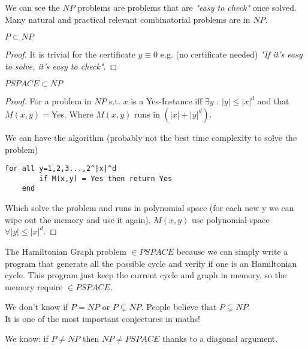 \begin{remark} We can see the $NP$ problems are problems that are \textit{"easy to check"} once solved.
Many natural and practical relevant combinatorial problems are in $NP$.
\end{remark}
\vspace{0.5cm}
\begin{theorem}$P\subset NP$
\end{theorem}
\begin{proof}
It is trivial for the certificate $y\equiv 0$ e.g. (no certificate needed) \textit{"If it's easy to solve, it's easy to check"}.
\end{proof}
\vspace{0.5cm}
\begin{theorem} $PSPACE \subset NP$
\end{theorem}
\begin{proof}
For a problem in $NP$ s.t. $x$ is a Yes-Instance iff $\exists y$ : $|y|\leq|x|^d$ and  that
$M(x,y)=$Yes. Where $M(x,y)$ runs in $(|x|+|y|^d)$.

We can have the algorithm (probably not the best time complexity to solve the problem)
\begin{lstlisting}[caption=$PSPACE \subset NP$ control algorithm]
    for all y=1,2,3...,2^|x|^d
        if M(x,y) = Yes then return Yes
    end
\end{lstlisting}

Which solve the problem and runs in polynomial space (for each new y we can wipe out the memory and use it again). $M(x,y)$ use polynomial-space $\forall |y| \leq |x|^d$.
\end{proof}
\vspace{0.5cm}
\begin{remark}
The Hamiltonian Graph problem $\in PSPACE$ because we can simply write a program that generate all the possible cycle and
verify if one is an Hamiltonian cycle. This program just keep the current cycle and graph in memory, so the memory require $\in PSPACE$.
\end{remark}
\vspace{0.5cm}
We don't know if $P=NP$ or $P\subsetneq NP$. People believe that $P\subsetneq NP$.\\
It is one of the most important conjectures in maths!
\\
\begin{remark}
We know: if $P\neq NP$ then $NP\neq PSPACE$ thanks to a diagonal argument.
\end{remark}

